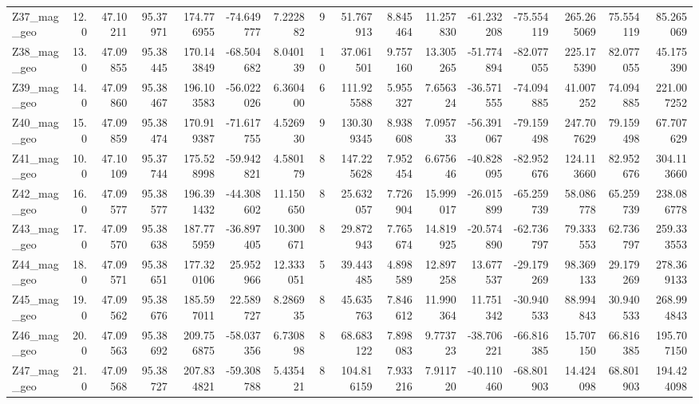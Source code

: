 \documentclass[11pt]{article}
\begin{document}
\begin{sidewaystable}
{\begin{tabular}{lrrrrrrrrrrrrrrr}
Z37\_mag\_geo &       12.0 &  47.10211 &  95.37971 &  174.776955 & -74.649777 &   7.222882 &   9 &   51.767913 &  8.845464 &  11.257830 &     -61.232208 & -75.554119 &  265.265069 &    75.554119 &    85.265069 \\
Z38\_mag\_geo &       13.0 &  47.09855 &  95.38445 &  170.143849 & -68.504682 &   8.040139 &  10 &   37.061501 &  9.757160 &  13.305265 &     -51.774894 & -82.077055 &  225.175390 &    82.077055 &    45.175390 \\
Z39\_mag\_geo &       14.0 &  47.09860 &  95.38467 &  196.103583 & -56.022026 &   6.360400 &   6 &  111.925588 &  5.955327 &   7.656324 &     -36.571555 & -74.094885 &   41.007252 &    74.094885 &   221.007252 \\
Z40\_mag\_geo &       15.0 &  47.09859 &  95.38474 &  170.919387 & -71.617755 &   4.526930 &   9 &  130.309345 &  8.938608 &   7.095733 &     -56.391067 & -79.159498 &  247.707629 &    79.159498 &    67.707629 \\
Z41\_mag\_geo &       10.0 &  47.10109 &  95.37744 &  175.528998 & -59.942821 &   4.580179 &   8 &  147.225628 &  7.952454 &   6.675646 &     -40.828095 & -82.952676 &  124.113660 &    82.952676 &   304.113660 \\
Z42\_mag\_geo &       16.0 &  47.09577 &  95.38577 &  196.391432 & -44.308602 &  11.150650 &   8 &   25.632057 &  7.726904 &  15.999017 &     -26.015899 & -65.259739 &   58.086778 &    65.259739 &   238.086778 \\
Z43\_mag\_geo &       17.0 &  47.09570 &  95.38638 &  187.775959 & -36.897405 &  10.300671 &   8 &   29.872943 &  7.765674 &  14.819925 &     -20.574890 & -62.736797 &   79.333553 &    62.736797 &   259.333553 \\
Z44\_mag\_geo &       18.0 &  47.09571 &  95.38651 &  177.320106 &  25.952966 &  12.333051 &   5 &   39.443485 &  4.898589 &  12.897258 &      13.677537 & -29.179269 &   98.369133 &    29.179269 &   278.369133 \\
Z45\_mag\_geo &       19.0 &  47.09562 &  95.38676 &  185.597011 &  22.589727 &   8.286935 &   8 &   45.635763 &  7.846612 &  11.990364 &      11.751342 & -30.940533 &   88.994843 &    30.940533 &   268.994843 \\
Z46\_mag\_geo &       20.0 &  47.09563 &  95.38692 &  209.756875 & -58.037356 &   6.730898 &   8 &   68.683122 &  7.898083 &   9.773723 &     -38.706221 & -66.816385 &   15.707150 &    66.816385 &   195.707150 \\
Z47\_mag\_geo &       21.0 &  47.09568 &  95.38727 &  207.834821 & -59.308788 &   5.435421 &   8 &  104.816159 &  7.933216 &   7.911720 &     -40.110460 & -68.801903 &   14.424098 &    68.801903 &   194.424098 \\

\end{tabular}}
\end{sidewaystable}
\end{document}
